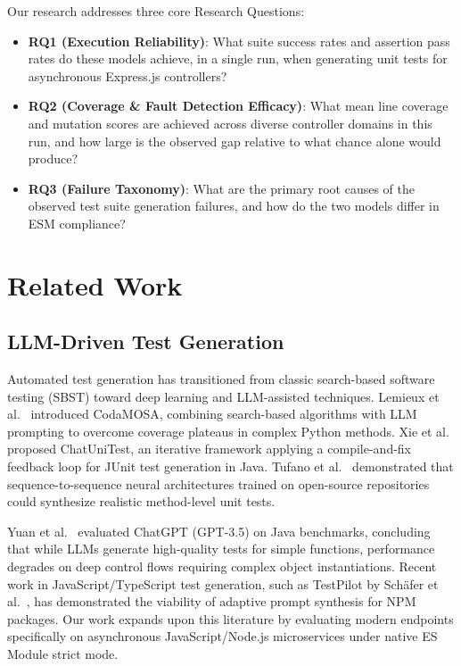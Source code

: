 \documentclass[conference]{IEEEtran}
\begin{document}
Our research addresses three core Research Questions:
\begin{itemize}
    \item \textbf{RQ1 (Execution Reliability)}: What suite success rates and assertion pass rates do these models achieve, in a single run, when generating unit tests for asynchronous Express.js controllers?
    \item \textbf{RQ2 (Coverage \& Fault Detection Efficacy)}: What mean line coverage and mutation scores are achieved across diverse controller domains in this run, and how large is the observed gap relative to what chance alone would produce?
    \item \textbf{RQ3 (Failure Taxonomy)}: What are the primary root causes of the observed test suite generation failures, and how do the two models differ in ESM compliance?
\end{itemize}

\section{Related Work}
\label{sec:related}

\subsection{LLM-Driven Test Generation}

Automated test generation has transitioned from classic search-based software testing (SBST) toward deep learning and LLM-assisted techniques. Lemieux et al.~\cite{lemieux2023codamosa} introduced CodaMOSA, combining search-based algorithms with LLM prompting to overcome coverage plateaus in complex Python methods. Xie et al.~\cite{chen2023chatunitest} proposed ChatUniTest, an iterative framework applying a compile-and-fix feedback loop for JUnit test generation in Java. Tufano et al.~\cite{tufano2021unit} demonstrated that sequence-to-sequence neural architectures trained on open-source repositories could synthesize realistic method-level unit tests.

Yuan et al.~\cite{yuan2024evaluating} evaluated ChatGPT (GPT-3.5) on Java benchmarks, concluding that while LLMs generate high-quality tests for simple functions, performance degrades on deep control flows requiring complex object instantiations. Recent work in JavaScript/TypeScript test generation, such as TestPilot by Sch\"afer et al.~\cite{schafer2024testpilot}, has demonstrated the viability of adaptive prompt synthesis for NPM packages. Our work expands upon this literature by evaluating modern endpoints specifically on asynchronous JavaScript/Node.js microservices under native ES Module strict mode.
\end{document}
